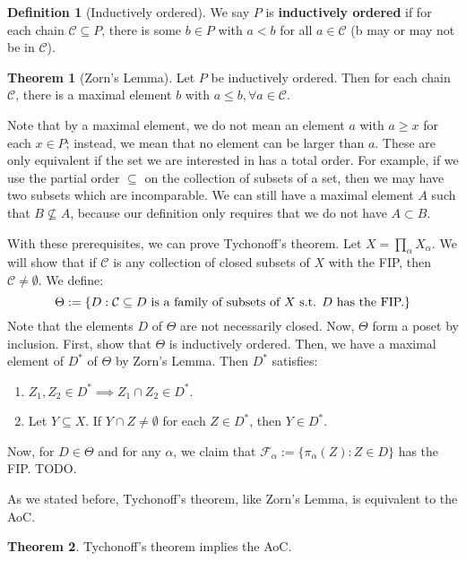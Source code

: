 \documentclass[11pt, oneside]{amsart}   	%
\theoremstyle{definition}
\newtheorem{definition}{Definition}[section]
\newtheorem{theorem}{Theorem}[section]
\begin{document}
	\begin{definition}[Inductively ordered]
		We say $P$ is \textbf{inductively ordered} if for each chain $\mathcal C\subseteq P$, there is some $b\in P$ with 
		$a < b$ for all $a\in\mathcal C$ (b may or may not be in $\mathcal C$). 
	\end{definition}
	
	\begin{theorem}[Zorn's Lemma]
		Let $P$ be inductively ordered. Then for each chain $\mathcal C$, there is a maximal element $b$ with 
		$a\leq b, \forall a\in\mathcal C$.
	\end{theorem}
	
	Note that by a maximal element, we do not mean an element $a$ with $a\geq x$ for each $x\in P$; instead, we mean 
	that no element can be larger than $a$. These are only equivalent if the set we are interested in has a total order. 
	For example, if we use the partial order $\subseteq$ on the collection of subsets of a set, then we may have two 
	subsets which are incomparable. We can still have a maximal element $A$ such that $B\not\subseteq A$, because 
	our definition only requires that we do not have $A\subset B$. 
	
	With these prerequisites, we can prove Tychonoff's theorem. Let $X = \prod_\alpha X_\alpha$. We will show that if 
	$\mathcal C$ is any collection of closed subsets of $X$ with the FIP, then $\mathcal C\neq\emptyset$. We define:
	$$
		\Theta := \{D : \mathcal C\subseteq D\textnormal{ is a family of subsets of } X \textnormal{ s.t. } D \textnormal{ has 
		the FIP.}\}
	$$
	Note that the elements $D$ of $\Theta$ are not necessarily closed. Now, $\Theta$ form a poset by inclusion. First, 
	show that $\Theta$ is inductively ordered. Then, we have a maximal element of $D^*$ of $\Theta$ by Zorn's Lemma.
	Then $D^*$ satisfies:
	\begin{enumerate}
		\item $Z_1, Z_2\in D^*\implies Z_1\cap Z_2\in D^*$.
		\item Let $Y\subseteq X$. If $Y\cap Z\neq\emptyset$ for each $Z\in D^*$, then $Y\in D^*$.
	\end{enumerate}
	Now, for $D\in\Theta$ and for any $\alpha$, we claim that $\mathcal F_\alpha :=\{\pi_\alpha(Z) : Z\in D\}$ has the FIP. 
	TODO.
	
	As we stated before, Tychonoff's theorem, like Zorn's Lemma, is equivalent to the AoC.
	
	\begin{theorem}
		Tychonoff's theorem implies the AoC.
	\end{theorem}
	
\end{document}
